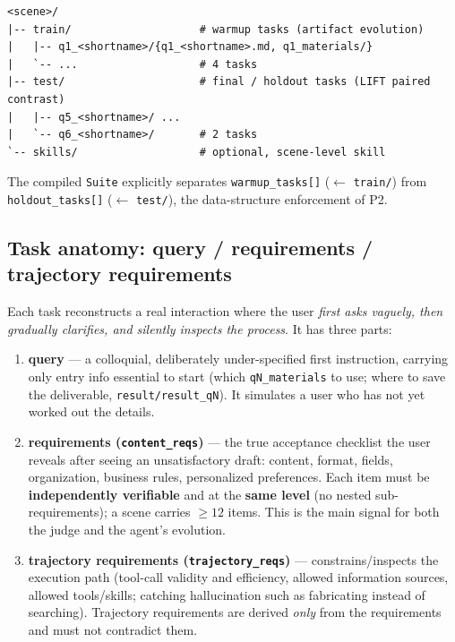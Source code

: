 \documentclass{article}
\begin{document}
\begin{lstlisting}
<scene>/
|-- train/                    # warmup tasks (artifact evolution)
|   |-- q1_<shortname>/{q1_<shortname>.md, q1_materials/}
|   `-- ...                   # 4 tasks
|-- test/                     # final / holdout tasks (LIFT paired contrast)
|   |-- q5_<shortname>/ ...
|   `-- q6_<shortname>/       # 2 tasks
`-- skills/                   # optional, scene-level skill
\end{lstlisting}

The compiled \texttt{Suite} explicitly separates \texttt{warmup\_tasks[]} ($\leftarrow$ \texttt{train/}) from \texttt{holdout\_tasks[]} ($\leftarrow$ \texttt{test/}), the data-structure enforcement of P2.

\subsection{Task anatomy: query / requirements / trajectory requirements}

Each task reconstructs a real interaction where the user \emph{first asks vaguely, then gradually clarifies, and silently inspects the process}. It has three parts:

\begin{enumerate}
\item \textbf{query} --- a colloquial, deliberately under-specified first instruction, carrying only entry info essential to start (which \texttt{qN\_materials} to use; where to save the deliverable, \texttt{result/result\_qN}). It simulates a user who has not yet worked out the details.
\item \textbf{requirements (\texttt{content\_reqs})} --- the true acceptance checklist the user reveals after seeing an unsatisfactory draft: content, format, fields, organization, business rules, personalized preferences. Each item must be \textbf{independently verifiable} and at the \textbf{same level} (no nested sub-requirements); a scene carries \textbf{$\geq 12$} items. This is the main signal for both the judge and the agent's evolution.
\item \textbf{trajectory requirements (\texttt{trajectory\_reqs})} --- constrains/inspects the execution path (tool-call validity and efficiency, allowed information sources, allowed tools/skills; catching hallucination such as fabricating instead of searching). Trajectory requirements are derived \emph{only} from the requirements and must not contradict them.
\end{enumerate}
\end{document}
